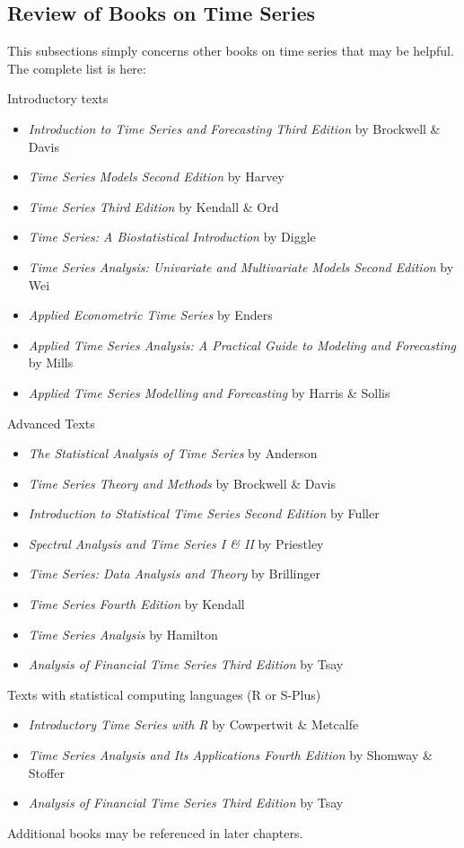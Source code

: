 \subsection{Review of Books on Time Series}
This subsections simply concerns other books on time series that may be helpful. The complete list is here:

Introductory texts
\begin{itemize}
	\item \textit{Introduction to Time Series and Forecasting Third Edition} by Brockwell \& Davis
	\item \textit{Time Series Models Second Edition} by Harvey
	\item \textit{Time Series Third Edition} by Kendall \& Ord
	\item \textit{Time Series: A Biostatistical Introduction} by Diggle
	\item \textit{Time Series Analysis: Univariate and Multivariate Models Second Edition} by Wei
	\item \textit{Applied Econometric Time Series} by Enders
	\item \textit{Applied Time Series Analysis: A Practical Guide to Modeling and Forecasting} by Mills
	\item \textit{Applied Time Series Modelling and Forecasting} by Harris \& Sollis
\end{itemize}

Advanced Texts
\begin{itemize}
	\item \textit{The Statistical Analysis of Time Series} by Anderson
	\item \textit{Time Series Theory and Methods} by Brockwell \& Davis
	\item \textit{Introduction to Statistical Time Series Second Edition} by Fuller
	\item \textit{Spectral Analysis and Time Series I \& II} by Priestley
	\item \textit{Time Series: Data Analysis and Theory} by Brillinger
	\item \textit{Time Series Fourth Edition} by Kendall
	\item \textit{Time Series Analysis} by Hamilton
	\item \textit{Analysis of Financial Time Series Third Edition} by Tsay
\end{itemize}

Texts with statistical computing languages (R or S-Plus)
\begin{itemize}
	\item \textit{Introductory Time Series with R} by Cowpertwit \& Metcalfe
	\item \textit{Time Series Analysis and Its Applications Fourth Edition} by Shomway \& Stoffer
	\item \textit{Analysis of Financial Time Series Third Edition} by Tsay
\end{itemize}

Additional books may be referenced in later chapters.
